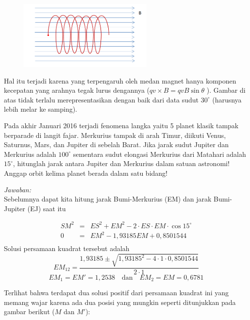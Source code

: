 \documentclass[11pt,fleqn, a4paper]{exam}
\begin{document}
\begin{questions}
\begin{enumerate}[a.]
\begin{figure}[H]
\centering
\includegraphics[width=0.6\textwidth]{gambar/spiral.png}
\end{figure}

Hal itu terjadi karena yang terpengaruh oleh medan magnet hanya komponen kecepatan yang arahnya tegak lurus dengannya ($q v \times B = qvB \sin{\theta}$ ). Gambar di atas tidak terlalu merepresentasikan dengan baik dari data sudut $30^{\circ}$ (harusnya lebih melar ke samping).


\end{enumerate}

\vspace{0.5cm}
\question Pada akhir Januari 2016 terjadi fenomena langka yaitu 5 planet klasik tampak berparade di langit fajar. Merkurius tampak di arah Timur, diikuti Venus, Saturnus, Mars, dan Jupiter di sebelah Barat. Jika jarak sudut Jupiter dan Merkurius adalah $100^{\circ}$ sementara sudut elongasi Merkurius dari Matahari adalah $15^{\circ}$, hitunglah jarak antara Jupiter dan Merkurius dalam satuan astronomi! Anggap orbit kelima planet berada dalam satu bidang!

\textit{Jawaban: }\\
Sebelumnya dapat kita hitung jarak Bumi-Merkurius (EM) dan jarak Bumi-Jupiter (EJ) saat itu

\begin{eqnarray*}
SM^2 &=& ES^2 + EM^2 - 2 \cdot ES \cdot EM \cdot \cos{15^{\circ}}\\
0 &=& EM^2 - 1,93185 EM + 0,8501544\\
\end{eqnarray*}
Solusi persamaan kuadrat tersebut adalah
\begin{equation*}
EM_{12} = \frac{1,93185 \pm \sqrt{1,93185^2 - 4 \cdot 1 \cdot 0,8501544}}{2 \cdot 1}
\end{equation*}
\begin{equation*}
EM_1 = EM' = 1,2538 \quad \text{dan} \quad EM_2 = EM = 0,6781 
\end{equation*}

Terlihat bahwa terdapat dua solusi positif dari persamaan kuadrat ini yang memang wajar karena ada dua posisi yang mungkin seperti ditunjukkan pada gambar berikut ($M$ dan $M'$):


\end{questions}
\end{document}
